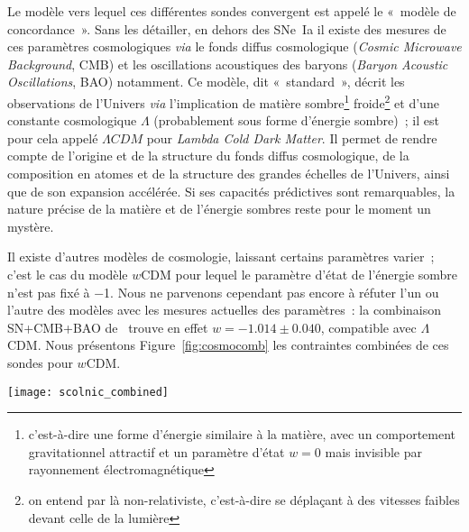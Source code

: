 \documentclass[../main/main.tex]{subfiles}
\begin{document}
Le modèle vers lequel ces différentes sondes convergent est appelé le «~modèle
de concordance~». Sans les détailler, en dehors des SNe~Ia il existe des mesures
de ces paramètres cosmologiques \textit{via} le fonds diffus cosmologique
(\textit{Cosmic Microwave Background}, CMB) et les oscillations acoustiques des
baryons (\textit{Baryon Acoustic Oscillations}, BAO) notamment.
Ce modèle, dit «~standard~», décrit les observations de l'Univers \textit{via}
l'implication de matière sombre\footnote{c'est-à-dire une forme d'énergie
    similaire à la matière, avec un comportement gravitationnel attractif et un
    paramètre d'état $w=0$ mais invisible par rayonnement
électromagnétique} froide\footnote{on entend par là non-relativiste,
c'est-à-dire se déplaçant à des vitesses faibles devant celle de la lumière} et
d'une constante cosmologique $\Lambda$ (probablement sous forme d'énergie
sombre)~; il est pour cela appelé $\Lambda CDM$ pour \textit{Lambda Cold Dark
Matter}. Il permet de rendre compte de l'origine et de la structure du fonds
diffus cosmologique, de la composition en atomes et de la structure des grandes
échelles de l'Univers, ainsi que de son expansion accélérée. Si ses capacités
prédictives sont remarquables, la nature précise de la matière et de l'énergie
sombres reste pour le moment un mystère.

Il existe d'autres modèles de cosmologie, laissant certains paramètres varier~;
c'est le cas du modèle $w$CDM pour lequel le paramètre d'état de l'énergie
sombre n'est pas fixé à \num{-1}. Nous ne parvenons cependant pas encore à
réfuter l'un ou l'autre des modèles avec les mesures actuelles des paramètres~:
la combinaison SN+CMB+BAO de~\cite{scolnic2018} trouve en effet $w =
\num{-1.014}\pm\num{0.040}$, compatible avec $\Lambda$CDM. Nous présentons
Figure~\ref{fig:cosmocomb} les contraintes combinées de ces sondes pour $w$CDM.

\begin{SCfigure}[1][ht]
    \centering
    \texttt{[image: scolnic\_combined]}
    \caption[Contraintes sur les paramètres cosmologiques $w$ et $\Omega_M$ par
    la combinaison SNe~Ia, CMB et BAO]{Contraintes à 68 et 95\% sur les
        paramètres cosmologiques $w$ et $\Omega_M$ par la combinaison SNe~Ia
        (\textit{en rouge}), par le CMB (\textit{en bleu}) fournies par la
        collaboration~\cite{planck2015}. Les contours \textit{jaunes} combinent
        le CMB et le BAO~\citep{alam2015}~; les contours \textit{noirs} le CMB
    et les SNe~Ia. Figure de~\cite{scolnic2018}.}\label{fig:cosmocomb}
\end{SCfigure}
\end{document}
